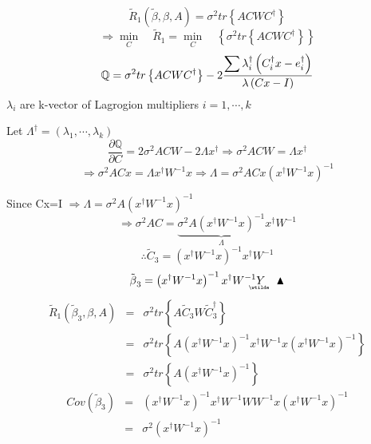 \documentclass{article}
\begin{document}
\begin{equation*}
\tilde{R}_{1}\left( \tilde{\beta},\beta ,A\right) =\sigma ^{2}tr\left\{
ACWC^{\dagger }\right\}
\end{equation*}%
\begin{equation*}
\Rightarrow \underset{C}{\min }\quad \tilde{R}_{1}=\underset{C}{\min }\quad
\left\{ \sigma ^{2}tr\left\{ ACWC^{\dagger }\right\} \right\}
\end{equation*}%
\begin{equation*}
\mathbb{Q}
=\sigma ^{2}tr\left\{ ACWC^{\dagger }\right\} -2\frac{\dsum \lambda
_{i}^{\dagger }\left( C_{i}^{\dagger }x-e_{i}^{\dagger }\right) }{\lambda
\left( Cx-I\right) }
\end{equation*}%
$\lambda _{i}$ are k-vector of Lagrogion multipliers $i=1,\cdots ,k$

Let $\Lambda ^{\dagger }=\left( \lambda _{1},\cdots ,\lambda _{k}\right) $%
\begin{equation*}
\frac{\partial 
\mathbb{Q}
}{\partial C}=2\sigma ^{2}ACW-2\Lambda x^{\dagger }\Rightarrow \sigma
^{2}ACW=\Lambda x^{\dagger }
\end{equation*}%
\begin{equation*}
\Rightarrow \sigma ^{2}ACx=\Lambda x^{\dagger }W^{-1}x\Rightarrow \Lambda
=\sigma ^{2}ACx\left( x^{\dagger }W^{-1}x\right) ^{-1}
\end{equation*}

Since Cx=I $\Rightarrow \Lambda =\sigma ^{2}A\left( x^{\dagger
}W^{-1}x\right) ^{-1}$%
\begin{equation*}
\Rightarrow \sigma ^{2}AC=\underset{\Lambda }{\underbrace{\sigma ^{2}A\left(
x^{\dagger }W^{-1}x\right) ^{-1}}}x^{\dagger }W^{-1}
\end{equation*}%
\begin{equation*}
\therefore \tilde{C}_{3}=\left( x^{\dagger }W^{-1}x\right) ^{-1}x^{\dagger
}W^{-1}
\end{equation*}%
\begin{equation*}
\therefore \tilde{\beta}_{3}=\left( x^{\dagger }W^{-1}x\right)
^{-1}x^{\dagger }W^{-1}%
\underaccent{\wtilde}{Y}%
\quad \blacktriangle 
\end{equation*}%
\begin{eqnarray*}
\tilde{R}_{1}\left( \tilde{\beta}_{3},\beta ,A\right)  &=&\sigma
^{2}tr\left\{ A\tilde{C}_{3}W\tilde{C}_{3}^{\dagger }\right\}  \\
&=&\sigma ^{2}tr\left\{ A\left( x^{\dagger }W^{-1}x\right) ^{-1}x^{\dagger
}W^{-1}x\left( x^{\dagger }W^{-1}x\right) ^{-1}\right\}  \\
&=&\sigma ^{2}tr\left\{ A\left( x^{\dagger }W^{-1}x\right) ^{-1}\right\} 
\end{eqnarray*}%
\begin{eqnarray*}
Cov\left( \tilde{\beta}_{3}\right)  &=&\left( x^{\dagger }W^{-1}x\right)
^{-1}x^{\dagger }W^{-1}WW^{-1}x\left( x^{\dagger }W^{-1}x\right) ^{-1} \\
&=&\sigma ^{2}\left( x^{\dagger }W^{-1}x\right) ^{-1}
\end{eqnarray*}
\end{document}
